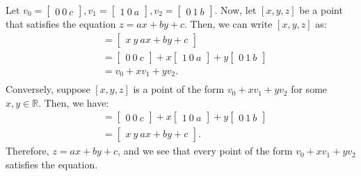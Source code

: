 \documentclass[
  letterpaper,
  DIV=11,
  numbers=noendperiod]{scrartcl}
\begin{document}
Let \(v_0 = \begin{bmatrix}0\ 0\ c\end{bmatrix}, v_1 = \begin{bmatrix}1\ 0\ a\end{bmatrix}, v_2 = \begin{bmatrix}0\ 1\ b\end{bmatrix}\).
Now, let \([x,y,z]\) be a point that satisfies the equation
\(z = ax + by + c\). Then, we can write \([x,y,z]\) as: \\
\begin{align*}
  [x,y,z] &= \begin{bmatrix}x\ y\ ax+by+c\end{bmatrix} \\
  &= \begin{bmatrix}0\ 0\ c\end{bmatrix} + x\begin{bmatrix}1\ 0\ a\end{bmatrix} + y\begin{bmatrix}0\ 1\ b\end{bmatrix} \\
  &= v_0 + x v_1 + y v_2. \\
\end{align*}
Conversely, suppose $[x,y,z]$ is a point of the form $v_0 + x v_1 + y v_2$ for some $x,y \in \mathbb{R}$. Then, we have: \\
\begin{align*}
  [x,y,z] &= \begin{bmatrix}0\ 0\ c\end{bmatrix} + x\begin{bmatrix}1\ 0\ a\end{bmatrix} + y\begin{bmatrix}0\ 1\ b\end{bmatrix} \\
  &= \begin{bmatrix}x\ y\ ax+by+c\end{bmatrix}.
\end{align*}
Therefore, $z = ax + by + c$, and we see that every point of the form $v_0 + x v_1 + y v_2$ satisfies the equation.
\end{document}
